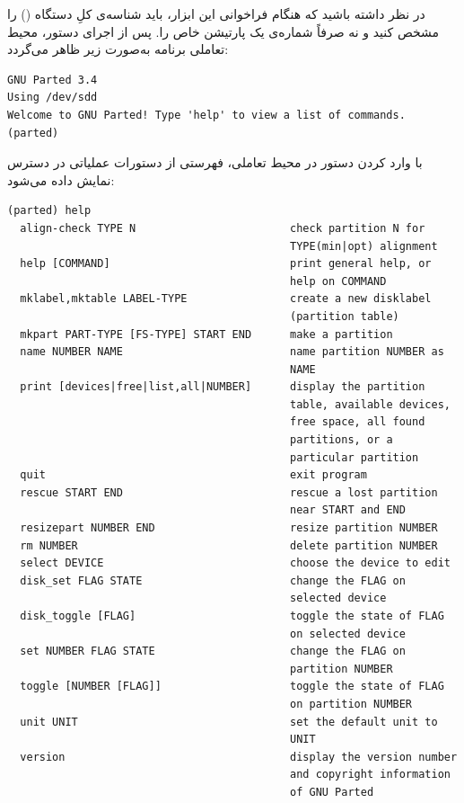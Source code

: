 در نظر داشته باشید که هنگام فراخوانی این ابزار، باید شناسه‌ی کلِ دستگاه () را مشخص کنید و نه صرفاً شماره‌ی یک پارتیشن خاص را. پس از اجرای دستور، محیط تعاملی برنامه به‌صورت زیر ظاهر می‌گردد:

\begin{latin}
\begin{lstlisting}
GNU Parted 3.4
Using /dev/sdd
Welcome to GNU Parted! Type 'help' to view a list of commands.
(parted)
\end{lstlisting}
\end{latin}

با وارد کردن دستور  در محیط تعاملی، فهرستی از دستورات عملیاتی در دسترس نمایش داده می‌شود:

\begin{latin}
\begin{lstlisting}
(parted) help
  align-check TYPE N                        check partition N for
                                            TYPE(min|opt) alignment
  help [COMMAND]                            print general help, or
                                            help on COMMAND
  mklabel,mktable LABEL-TYPE                create a new disklabel
                                            (partition table)
  mkpart PART-TYPE [FS-TYPE] START END      make a partition
  name NUMBER NAME                          name partition NUMBER as
                                            NAME
  print [devices|free|list,all|NUMBER]      display the partition
                                            table, available devices,
                                            free space, all found
                                            partitions, or a
                                            particular partition
  quit                                      exit program
  rescue START END                          rescue a lost partition
                                            near START and END
  resizepart NUMBER END                     resize partition NUMBER
  rm NUMBER                                 delete partition NUMBER
  select DEVICE                             choose the device to edit
  disk_set FLAG STATE                       change the FLAG on
                                            selected device
  disk_toggle [FLAG]                        toggle the state of FLAG
                                            on selected device
  set NUMBER FLAG STATE                     change the FLAG on
                                            partition NUMBER
  toggle [NUMBER [FLAG]]                    toggle the state of FLAG
                                            on partition NUMBER
  unit UNIT                                 set the default unit to
                                            UNIT
  version                                   display the version number
                                            and copyright information
                                            of GNU Parted
\end{lstlisting}
\end{latin}

